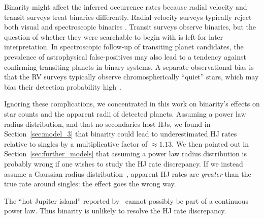 \documentclass[12pt,modern]{aastex61}
\begin{document}
Binarity might affect the inferred occurrence rates because 
radial velocity and transit surveys treat binaries differently.
Radial velocity surveys typically reject both visual and spectroscopic
binaries \citep{wright_frequency_2012}.  Transit
surveys observe binaries, but the question of whether they were
searchable to begin with is left for later interpretation.  In
spectroscopic follow-up of transiting planet candidates, the
prevalence of astrophysical false-positives may also lead to a
tendency against confirming transiting planets in binary systems.  A
separate observational bias is that the RV surveys typically observe
chromospherically ``quiet'' stars, which may bias their detection
probability high~\citep{bastien_radial_2014}.

Ignoring these complications, we concentrated in this work on
binarity's effects on star counts and the apparent radii of detected
planets.  Assuming a power law radius distribution, and that no
secondaries host HJs, we found in Section~\ref{sec:model_3} that
binarity could lead to underestimated HJ rates relative to singles by
a multiplicative factor of $\approx 1.13$.  We then pointed out in
Section~\ref{sec:further_models} that assuming a power law radius
distribution is probably wrong if one wishes to study the HJ rate
discrepancy.  If we instead assume a Gaussian radius
distribution~\citep[following][]{petigura_CKS_2017}, apparent HJ rates
are {\it greater} than the true rate around singles: the effect goes
the wrong way.

The ``hot Jupiter island'' reported by~\citet{petigura_CKS_2017}
cannot possibly be part of a continuous power law.  Thus binarity is
unlikely to resolve the HJ rate discrepancy.
\end{document}
